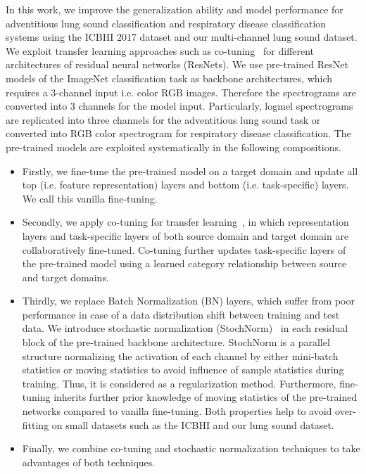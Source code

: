 \documentclass[journal]{IEEEtran}
\begin{document}
In this work, we improve the generalization ability and model performance for adventitious lung sound classification and respiratory disease classification systems using the ICBHI 2017 dataset and our multi-channel lung sound dataset. We exploit transfer learning approaches  such as co-tuning~\cite{you2020co} for different architectures of residual neural networks (ResNets). We use pre-trained ResNet models of the ImageNet classification task as backbone architectures, which requires a 3-channel input i.e. color RGB images. Therefore the spectrograms are converted into 3 channels for the model input. Particularly, logmel spectrograms are replicated into three channels for the adventitious lung sound task or converted into RGB color spectrogram for respiratory disease classification. The pre-trained models are exploited systematically in the following compositions. 
\begin{itemize}
	\item Firstly, we fine-tune the pre-trained model on a target domain and update all top (i.e. feature representation) layers and bottom (i.e. task-specific) layers. We call this vanilla fine-tuning.
	\item Secondly, we apply co-tuning for transfer learning~\cite{you2020co}, in which representation layers and task-specific layers of both source domain and target domain are collaboratively fine-tuned. Co-tuning further updates task-specific layers of the pre-trained model using a learned category relationship between source and target domains.
	\item Thirdly, we replace Batch Normalization (BN) layers, which suffer from poor performance in case of a data distribution shift between training and test data. We introduce stochastic normalization (StochNorm)~\cite{kou2020stochastic} in each residual block of the pre-trained backbone architecture. StochNorm is a parallel structure normalizing the activation of each channel by either mini-batch statistics or moving statistics to avoid influence of sample statistics during training. Thus, it is considered as a regularization method. Furthermore, fine-tuning inherits further prior knowledge of moving statistics of the pre-trained networks compared to vanilla fine-tuning. Both properties help to avoid over-fitting on small datasets such as the ICBHI and our lung sound dataset.
	\item Finally, we combine co-tuning and stochastic normalization techniques to take advantages of both techniques.
\end{itemize}
\end{document}
